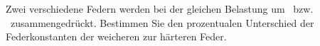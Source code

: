 Zwei verschiedene Federn werden bei der gleichen Belastung um \xhO\ bzw. \xwO\ zusammengedrückt. Bestimmen Sie den prozentualen Unterschied der Federkonstanten der weicheren zur härteren Feder.
